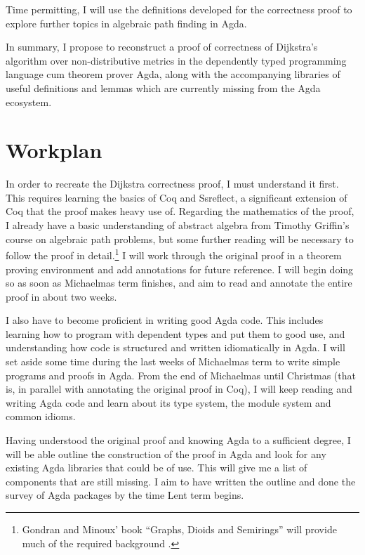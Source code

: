 \documentclass[a4paper]{scrartcl}
\begin{document}
Time permitting, I will use the definitions developed for the correctness proof to explore further topics in algebraic path finding in Agda.

In summary, I propose to reconstruct a proof of correctness of Dijkstra's algorithm over non-distributive metrics in the dependently typed programming language cum theorem prover Agda, along with the accompanying libraries of useful definitions and lemmas which are currently missing from the Agda ecosystem.


\section{Workplan%
  \label{workplan}%
}

In order to recreate the Dijkstra correctness proof, I must understand it first. This requires learning the basics of Coq and Ssreflect, a significant extension of Coq that the proof makes heavy use of. Regarding the mathematics of the proof, I already have a basic understanding of abstract algebra from Timothy Griffin's course on algebraic path problems, but some further reading will be necessary to follow the proof in detail.\footnote{Gondran and Minoux' book \enquote{Graphs, Dioids and Semirings} will provide much of the required background \autocite{gondran_graphs_2008}.} I will work through the original proof in a theorem proving environment and add annotations for future reference. I will begin doing so as soon as Michaelmas term finishes, and aim to read and annotate the entire proof in about two weeks.

I also have to become proficient in writing good Agda code. This includes learning how to program with dependent types and put them to good use, and understanding how code is structured and written idiomatically in Agda. I will set aside some time during the last weeks of Michaelmas term to write simple programs and proofs in Agda. From the end of Michaelmas until Christmas (that is, in parallel with annotating the original proof in Coq), I will keep reading and writing Agda code and learn about its type system, the module system and common idioms.

Having understood the original proof and knowing Agda to a sufficient degree, I will be able outline the construction of the proof in Agda and look for any existing Agda libraries that could be of use. This will give me a list of components that are still missing. I aim to have written the outline and done the survey of Agda packages by the time Lent term begins.
\end{document}
